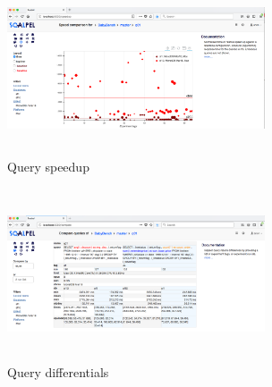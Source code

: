 \documentclass{cidr-2019}
\begin{document}

\begin{figure}[t!]
\centering
\includegraphics[height=2in,width=3in]{Figures/speedup3.png}
\caption{Query speedup
	\label{fig:speedup2}}
\end{figure}

\begin{figure}[t!]
\centering
\includegraphics[height=2in,width=3in]{Figures/compare2.png}
\caption{Query differentials
	\label{fig:differential}}
\end{figure}










\end{document}
